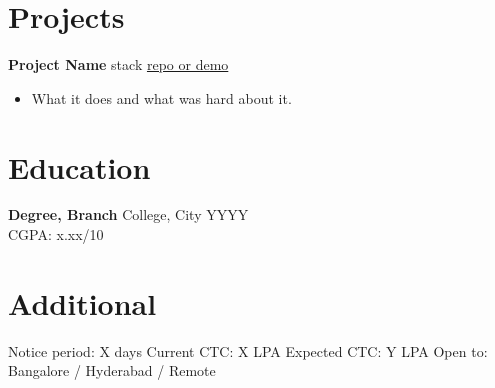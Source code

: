 \documentclass[11pt,a4paper]{article}
\begin{document}
\section{Projects}
\textbf{{{Project Name}}} \textendash{} {{stack}} \hfill \href{{{URL}}}{{{repo or demo}}}
\begin{itemize}
  \item {{What it does and what was hard about it.}}
\end{itemize}

\section{Education}
\textbf{{{Degree, Branch}}} \textendash{} {{College}}, {{City}} \hfill {{YYYY}}\\
CGPA: {{x.xx/10}} %

\section{Additional}
Notice period: {{X days}} \textbullet{} Current CTC: {{X LPA}} \textbullet{}
Expected CTC: {{Y LPA}} \textbullet{} Open to: {{Bangalore / Hyderabad / Remote}}
\end{document}
